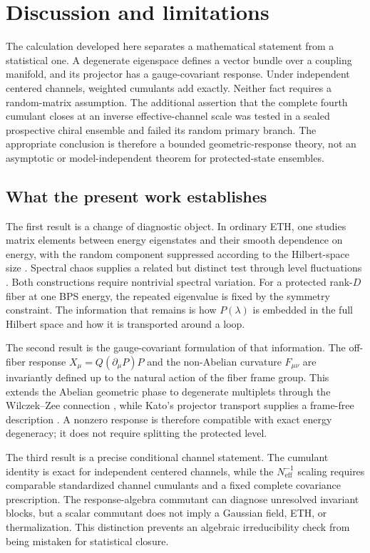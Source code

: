 \section{Discussion and limitations}
\label{sec:discussion}

The calculation developed here separates a mathematical statement from a
statistical one.  A degenerate eigenspace defines a vector bundle over a
coupling manifold, and its projector has a gauge-covariant response.  Under
independent centered channels, weighted cumulants add exactly.  Neither fact
requires a random-matrix assumption.  The additional assertion that the
complete fourth cumulant closes at an inverse effective-channel scale was
tested in a sealed prospective chiral ensemble and failed its random primary
branch.  The appropriate conclusion is therefore a bounded geometric-response
theory, not an asymptotic or model-independent theorem for protected-state
ensembles.

\subsection{What the present work establishes}

The first result is a change of diagnostic object.  In ordinary ETH, one
studies matrix elements between energy eigenstates and their smooth dependence
on energy, with the random component suppressed according to the Hilbert-space
size \cite{deutsch1991,srednicki1994}.  Spectral chaos supplies a related but
distinct test through level fluctuations \cite{bohigas1984,atas2013}.  Both
constructions require nontrivial spectral variation.  For a protected rank-$D$
fiber at one BPS energy, the repeated eigenvalue is fixed by the symmetry
constraint.  The information that remains is how $P(\lambda)$ is embedded in
the full Hilbert space and how it is transported around a loop.

The second result is the gauge-covariant formulation of that information.  The
off-fiber response $X_\mu=Q(\partial_\mu P)P$ and the non-Abelian curvature
$F_{\mu\nu}$ are invariantly defined up to the natural action of the fiber
frame group.  This extends the Abelian geometric phase
\cite{berry1984} to degenerate multiplets through the Wilczek--Zee connection
\cite{wilczekzee1984}, while Kato's projector transport supplies a frame-free
description \cite{kato1950}.  A nonzero response is therefore compatible with
exact energy degeneracy; it does not require splitting the protected level.

The third result is a precise conditional channel statement.  The cumulant
identity is exact for independent centered channels, while the
$N_{\mathrm{eff}}^{-1}$ scaling requires comparable standardized channel
cumulants and a fixed complete covariance prescription.  The response-algebra
commutant can diagnose unresolved invariant blocks, but a scalar commutant does
not imply a Gaussian field, ETH, or thermalization.  This distinction prevents
an algebraic irreducibility check from being mistaken for statistical closure.

